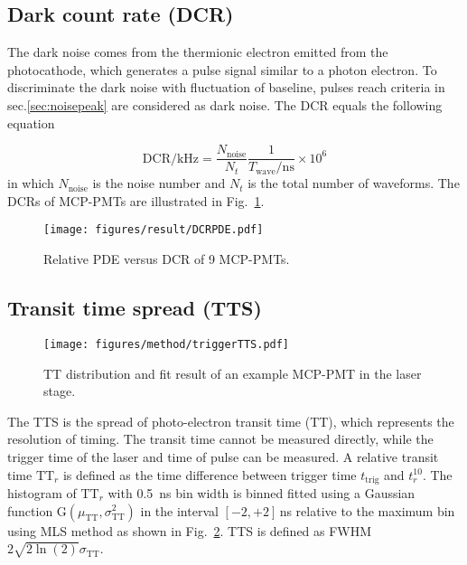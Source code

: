 \subsection{Dark count rate (DCR)}
The dark noise comes from the thermionic electron emitted from the photocathode, which generates a pulse signal similar to a photon electron. To discriminate the dark noise with fluctuation of baseline, pulses reach criteria in sec.\ref{sec:noisepeak} are considered as dark noise. The DCR equals the following equation

\begin{equation}
    \mathrm{DCR/kHz} = \frac{N_{\mathrm{noise}}}{N_{t}}\frac{1}{T_{\mathrm{wave}}/\mathrm{ns}}\times 10^{6}
\end{equation}
in which $N_{\mathrm{noise}}$ is the noise number and $N_{t}$ is the total number of waveforms. The DCRs of MCP-PMTs are illustrated in Fig.~\ref{fig:DCRCompare}.

\begin{figure}[!htbp]
    \centering
    \texttt{[image: figures/result/DCRPDE.pdf]}
    \caption{Relative PDE versus DCR of 9 MCP-PMTs.}
    \label{fig:DCRCompare}
\end{figure}

\subsection{Transit time spread (TTS)}
\begin{figure}[!htbp]
    \centering
    \texttt{[image: figures/method/triggerTTS.pdf]}
    \caption{TT distribution and fit result of an example MCP-PMT in the laser stage.}
    \label{fig:triggerTTS}
\end{figure}

The TTS is the spread of photo-electron transit time (TT), which represents the resolution of timing. The transit time cannot be measured directly, while the trigger time of the laser and time of pulse can be measured. A relative transit time $\mathrm{TT}_r$ is defined as the time difference between trigger time $t_{\mathrm{trig}}$ and $t_r^{10}$. The histogram of $\mathrm{TT}_r$ with \SI{0.5}{ns} bin width is binned fitted using a Gaussian function G$(\mu_{\mathrm{TT}},\sigma_{\mathrm{TT}}^2)$ in the interval $[-2,+2]$\,ns relative to the maximum bin using MLS method as shown in Fig.~\ref{fig:triggerTTS}.
TTS is defined as FWHM\cite{HAMAMATSUManual} $2\sqrt{2\ln(2)}\sigma_{\mathrm{TT}}$.

